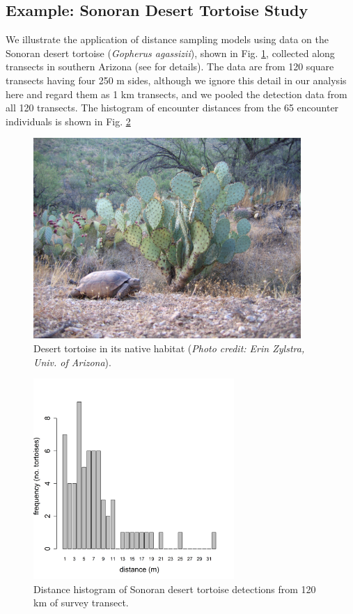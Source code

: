 \subsection{Example: Sonoran Desert Tortoise Study}

We illustrate the application of distance sampling models using data
on the Sonoran desert tortoise ({\it Gopherus agassizii}), shown in
Fig. \ref{closed.fig.tortoise}, collected along transects
in southern Arizona (see \citet{zylstra_etal:2010} for
details). The data are from 120 square transects having four 250 m sides,
 although we ignore this detail in our analysis here and regard
them as 1 km transects, and we pooled the detection data from all
120 transects. The histogram of encounter distances from the 65
encounter individuals is
shown in Fig. \ref{closed.fig.tortoisehist}
\begin{figure}
\centering
\includegraphics[height=3in,width=4in]{Ch3-Closed/figs/Erin_Zylstra_2.jpg}
\caption{Desert tortoise in its native habitat ({\it Photo credit: Erin
  Zylstra, Univ. of Arizona}).}
\label{closed.fig.tortoise}
\end{figure}

\begin{figure}[h]
\centering
\includegraphics[height=3.0in,width=3.0in]{Ch3-Closed/figs/tortoise.png}
\caption{
Distance histogram of Sonoran desert tortoise detections from 120 km of
survey transect. }
\label{closed.fig.tortoisehist}
\end{figure}

